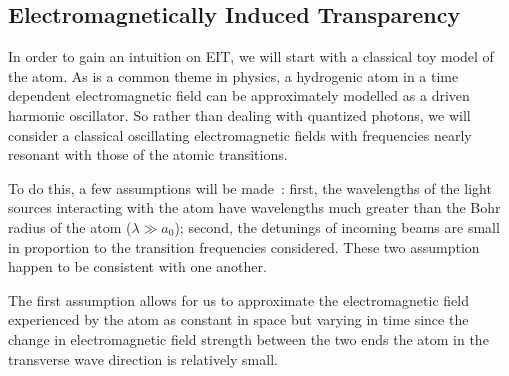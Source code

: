 \documentclass[aps,pra,showpacs,amsmath,amssymb,nofootinbib,longbibliography,superscriptaddress
]{revtex4-1}
\theoremstyle{definition}
\theoremstyle{remark}
\newcommand{\0}{\hat{0}}
\begin{document}
\subsection{Electromagnetically Induced Transparency}

In order to gain an intuition on EIT, we will start with a classical toy model of the atom. As is a common theme in physics, a hydrogenic atom in a time dependent electromagnetic field can be approximately modelled as a driven harmonic oscillator. So rather than dealing with quantized photons, we will consider a classical oscillating electromagnetic fields with frequencies nearly resonant with those of the atomic transitions.

To do this, a few assumptions will be made~\cite{Tong}: first, the wavelengths of the light sources interacting with the atom have wavelengths much greater than the Bohr radius of the atom ($\lambda \gg a_0$); second, the detunings of incoming beams are small in proportion to the transition frequencies considered. These two assumption happen to be consistent with one another.

The first assumption allows for us to approximate the electromagnetic field experienced by the atom as constant in space but varying in time since the change in electromagnetic field strength between the two ends the atom in the transverse wave direction is relatively small.
\end{document}
